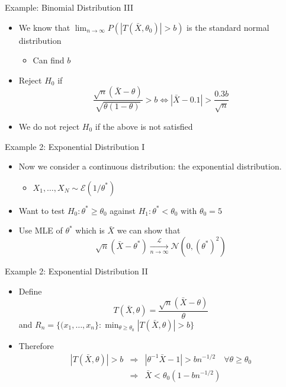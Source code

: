 \documentclass{beamer}
\begin{document}
\begin{frame}{Example: Binomial Distribution III} 
\begin{itemize} 
 \item We know that $\lim_{n \rightarrow \infty} P(|T(\bar{X}, \theta_0)| > b) $ is the standard normal distribution
 \begin{itemize}
 \item Can find $b$ 
 \end{itemize} 
 \item Reject $H_0$ if 
 \begin{displaymath} 
 \frac{\sqrt{n}(\bar{X} - \theta)}{\sqrt{\theta(1- \theta)}} > b \Leftrightarrow |\bar{X} - 0.1| > \frac{0.3b}{\sqrt{n}} 
 \end{displaymath}
\item We do not reject $H_0$ if the above is not satisfied 
\end{itemize}
\end{frame}

\begin{frame}{Example 2: Exponential Distribution I}  
\begin{itemize} 
 \item Now we consider a continuous distribution: the exponential distribution. 
\begin{itemize} 
\item $X_1, \ldots, X_N \sim  \mathcal{E}(1/\theta^*)$ 
\end{itemize}
\item Want to test $H_0: \theta^* \geq \theta_0$ against $H_1: \theta^* < \theta_0$ with $\theta_0 = 5$ 
\item Use MLE of $\theta^*$ which is $\bar{X}$ we can show that 
\begin{displaymath} 
 \sqrt{n}(\bar{X} - \theta^*) \xrightarrow[n \rightarrow \infty]{\mathcal{L}} \mathcal{N}(0, (\theta^*)^2)
\end{displaymath}
\end{itemize}
\end{frame}

\begin{frame}{Example 2: Exponential Distribution II} 
\begin{itemize}
 \item Define 
\begin{displaymath} 
T(\bar{X}, \theta) = \frac{\sqrt{n}(\bar{X} - \theta)}{\theta}
\end{displaymath}
and $R_n = \{(x_1, \ldots, x_n\} : \min_{\theta \geq \theta_0} |T(\bar{X}, \theta) | > b\}$ 
\item Therefore 
\begin{eqnarray*} 
|T(\bar{X}, \theta) | > b &\Rightarrow& |\theta^{-1} \bar{X} - 1| > bn^{-1/2} \quad \forall \theta \geq \theta_0 \\ 
&\Rightarrow& \bar{X} < \theta_0(1 - bn^{-1/2})  \\ 
\end{eqnarray*}
\end{itemize}
\end{frame}
\end{document}
